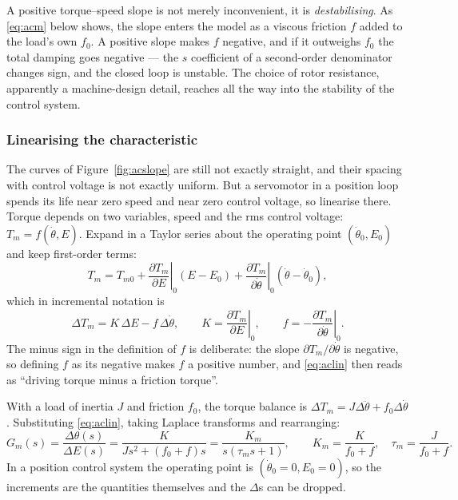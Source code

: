 \documentclass[11pt,a4paper]{article}
\begin{document}
\begin{pitfall}
A positive torque--speed slope is not merely inconvenient, it is
\emph{destabilising}. As \eqref{eq:acm} below shows, the slope enters the model
as a viscous friction $f$ added to the load's own $f_{0}$. A positive slope
makes $f$ negative, and if it outweighs $f_{0}$ the total damping goes
negative --- the $s$ coefficient of a second-order denominator changes sign,
and the closed loop is unstable. The choice of rotor resistance, apparently a
machine-design detail, reaches all the way into the stability of the control
system.
\end{pitfall}

\subsubsection{Linearising the characteristic}

The curves of Figure~\ref{fig:acslope} are still not exactly straight, and
their spacing with control voltage is not exactly uniform. But a servomotor in
a position loop spends its life near zero speed and near zero control voltage,
so linearise there. Torque depends on two variables, speed and the rms control
voltage: $T_{m}=f(\dot\theta,E)$. Expand in a Taylor series about the operating
point $(\dot\theta_{0},E_{0})$ and keep first-order terms:
\[
  T_{m}=T_{m0}
    +\left.\frac{\partial T_{m}}{\partial E}\right|_{0}(E-E_{0})
    +\left.\frac{\partial T_{m}}{\partial\dot\theta}\right|_{0}
      (\dot\theta-\dot\theta_{0}),
\]
which in incremental notation is
\begin{equation}
  \Delta T_{m}=K\,\Delta E-f\,\Delta\dot\theta,
  \qquad
  K=\left.\frac{\partial T_{m}}{\partial E}\right|_{0},
  \qquad
  f=-\left.\frac{\partial T_{m}}{\partial\dot\theta}\right|_{0}.
  \label{eq:aclin}
\end{equation}
The minus sign in the definition of $f$ is deliberate: the slope
$\partial T_{m}/\partial\dot\theta$ is negative, so defining $f$ as its
negative makes $f$ a positive number, and \eqref{eq:aclin} then reads as
``driving torque minus a friction torque''.

With a load of inertia $J$ and friction $f_{0}$, the torque balance is
$\Delta T_{m}=J\Delta\ddot\theta+f_{0}\Delta\dot\theta$. Substituting
\eqref{eq:aclin}, taking Laplace transforms and rearranging:
\begin{equation}
  G_{m}(s)=\frac{\Delta\theta(s)}{\Delta E(s)}
   =\frac{K}{Js^{2}+(f_{0}+f)s}
   =\frac{K_{m}}{s(\tau_{m}s+1)},
  \qquad
  K_{m}=\frac{K}{f_{0}+f},\quad
  \tau_{m}=\frac{J}{f_{0}+f} .
  \label{eq:acm}
\end{equation}
In a position control system the operating point is $(\dot\theta_{0}=0,
E_{0}=0)$, so the increments are the quantities themselves and the $\Delta$s
can be dropped.
\end{document}
